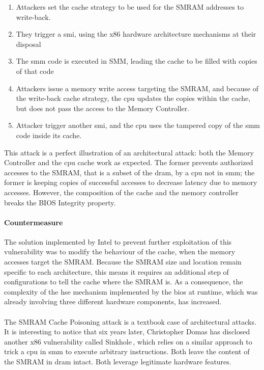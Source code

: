 \begin{enumerate}
\item Attackers set the cache strategy to be used for the SMRAM addresses to
  write-back.

%
\item They trigger a \ac{smi}, using the x86 hardware architecture mechanisms at
  their disposal
%
\item The \ac{smm} code is executed in SMM, leading the cache to be filled with
  copies of that code
%
\item Attackers issue a memory write access targeting the SMRAM, and because of
  the write-back cache strategy, the \ac{cpu} updates the copies within the
  cache, but does not pass the access to the Memory Controller.
%
\item Attacker trigger another \ac{smi}, and the \ac{cpu} uses the tampered copy
  of the \ac{smm} code inside its cache.
\end{enumerate}
%
This attack is a perfect illustration of an architectural attack:
%
both the Memory Controller and the \ac{cpu} cache work as expected.
%
The former prevents authorized accesses to the SMRAM, that is a subset of the
\ac{dram}, by a \ac{cpu} not in \ac{smm};
%
the former is keeping copies of successful accesses to decrease latency due to memory
accesses.
%
However, the composition of the cache and the memory controller breaks the BIOS
Integrity property.

\paragraph{Countermeasure}
%
The solution implemented by Intel to prevent further exploitation of this
vulnerability was to modify the behaviour of the cache, when the memory accesses
target the SMRAM.
%
Because the SMRAM size and location remain specific to each architecture, this
means it requires an additional step of configurations to tell the cache where
the SMRAM is.
%
As a consequence, the complexity of the \ac{hse} mechanism implemented by the
\ac{bios} at runtime, which was already involving three different hardware
components, has increased.

\paragraph{}
%
The SMRAM Cache Poisoning attack is a textbook case of architectural attacks.
%
It is interesting to notice that six years later, Christopher Domas has
disclosed another x86 vulnerability called Sinkhole\,\cite{domas2015sinkhole},
which relies on a similar approach to trick a \ac{cpu} in \ac{smm} to execute
arbitrary instructions.
%
Both leave the content of the SMRAM in \ac{dram} intact.
%
Both leverage legitimate hardware features.

